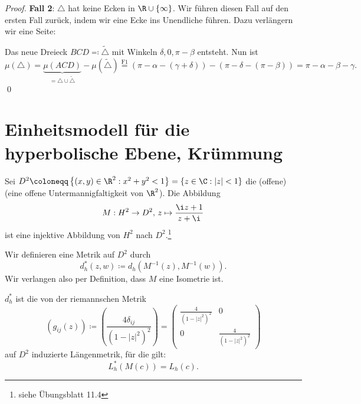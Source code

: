 \begin{remark}
\begin{enumerate}
\begin{proof}
      \textbf{Fall 2}: \( \triangle \) hat keine Ecken in \( \R \cup \left \{ \infty \right \} \). Wir führen diesen Fall auf den ersten Fall zurück, indem wir eine Ecke ins Unendliche führen. Dazu verlängern wir eine Seite:


      Das neue Dreieck \( BCD \eqqcolon \widetilde{\triangle} \) mit Winkeln \( \delta, 0, \pi - \beta \) entsteht. Nun ist
      \begin{equation*}
        \mu(\triangle) = \underbrace{\mu(ACD)}_{= \triangle \cup \widetilde{\triangle}} - \mu(\widetilde{\triangle}) \overset{\text{F1}}{=} \left( \pi - \alpha - (\gamma + \delta) \right) - \left( \pi - \delta - (\pi - \beta) \right) = \pi - \alpha - \beta - \gamma\text{.}
      \end{equation*} \qed
    \end{proof}
  \end{enumerate}
\end{remark}

\section{Einheitsmodell für die hyperbolische Ebene, Krümmung}

Sei \( D^2 \coloneqq \left \{ (x,y) \in \R^2 : x^2 + y^2 < 1 \right \} = \left \{ z \in \C : \left\vert z \right\vert < 1 \right \} \) die (offene)  (eine offene Untermannigfaltigkeit von \( \R^2 \)). Die Abbildung
\begin{equation*}
  M : H^2 \to D^2\text{,} \ z \mapsto \frac{\i z + 1}{z + \i}
\end{equation*}
ist eine injektive Abbildung von \( H^2 \) nach \( D^2 \).\footnote{siehe Übungsblatt 11.4}

Wir definieren eine Metrik auf \( D^2 \) durch
\begin{equation*}
  d_h^\ast(z,w) \coloneqq d_h\left( M^{-1}(z),M^{-1}(w) \right)\text{.}
\end{equation*}
Wir verlangen also per Definition, dass \( M \) eine Isometrie ist.

\begin{remark}
  \( d_h^\ast \) ist die von der riemannschen Metrik
  \begin{equation*}
    \left( g_{ij}(z) \right) \coloneqq \left( \frac{4\delta_{ij}}{\left( 1-\left\vert z \right\vert^2 \right)^2} \right) = \begin{pmatrix}
      \frac{4}{\left( 1-\left\vert z \right\vert^2 \right)^2} & 0 \\
      0 & \frac{4}{\left( 1-\left\vert z \right\vert^2 \right)^2}
    \end{pmatrix}
  \end{equation*}
  auf \( D^2 \) induzierte Längenmetrik, für die gilt:
  \begin{equation*}
    L_h^\ast(M(c)) = L_h(c)\text{.}
  \end{equation*}
\end{remark}

